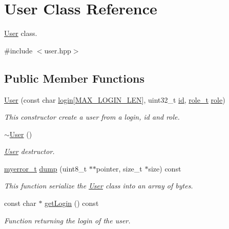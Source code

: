 \hypertarget{classUser}{}\section{User Class Reference}
\label{classUser}


\hyperlink{classUser}{User} class.  




{\ttfamily \#include $<$user.\+hpp$>$}

\subsection*{Public Member Functions}
\begin{DoxyCompactItemize}
\item 
\hyperlink{classUser_a09455487efcb1b5fb6b743a75fccb123}{User} (const char \hyperlink{classUser_a1d1e3a5d1dcc02ae1c36c3311e8c25b4}{login}\mbox{[}\hyperlink{user_8hpp_a43842dcd60d621d7d9c9b9e4ecd76f78}{M\+A\+X\+\_\+\+L\+O\+G\+I\+N\+\_\+\+L\+E\+N}\mbox{]}, uint32\+\_\+t \hyperlink{classUser_aa968324a879499589f584dc6f3c6a6e2}{id}, \hyperlink{user_8hpp_a147824aa4797bb7a9bcf276b5de0cb7c}{role\+\_\+t} \hyperlink{classUser_a9b04781b4e2bcd9f76deed61ba326237}{role})
\begin{DoxyCompactList}\small\item\em This constructor create a user from a login, id and role. \end{DoxyCompactList}\item 
\hyperlink{classUser_ac00b72ad64eb4149f7b21b9f5468c2b2}{$\sim$\+User} ()
\begin{DoxyCompactList}\small\item\em \hyperlink{classUser}{User} destructor. \end{DoxyCompactList}\item 
\hyperlink{error_8hpp_acabd2917084445509becf54ab64a4bd0}{myerror\+\_\+t} \hyperlink{classUser_a977bb5f43b08381c40e979ef0681f6d0}{dump} (uint8\+\_\+t $\ast$$\ast$pointer, size\+\_\+t $\ast$size) const 
\begin{DoxyCompactList}\small\item\em This function serialize the \hyperlink{classUser}{User} class into an array of bytes. \end{DoxyCompactList}\item 
const char $\ast$ \hyperlink{classUser_adba4ac3eacf305b1dcfa7b82dc95817e}{get\+Login} () const 
\begin{DoxyCompactList}\small\item\em Function returning the login of the user. \end{DoxyCompactList}\end{DoxyCompactItemize}
